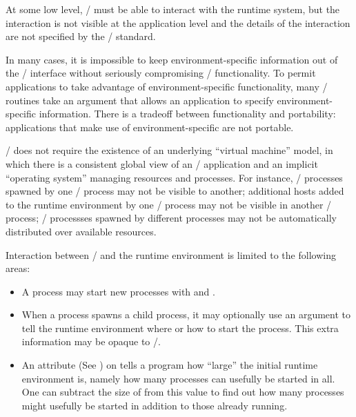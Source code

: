 At some low level, \MPI/ must be able to interact with the
runtime system, but the interaction is not visible at the application
level and the details of the interaction are not specified by the \MPI/
standard.

In many cases, it is impossible to keep environment-specific
information out of the \MPI/ interface without seriously compromising
\MPI/ functionality. To permit applications to take advantage of
environment-specific functionality, many \MPI/ routines take
an  argument that allows an application to
specify environment-specific information. There is a tradeoff
between functionality and portability: applications that
make use of environment-specific  are
not portable.

\MPI/ does not require the existence of an underlying ``virtual machine''
model, in which there is a consistent global view of an \MPI/
application and an implicit ``operating system'' managing resources
and processes. For instance, \MPI/ processes spawned by one \MPI/ process  may not be
visible to another; additional hosts added to the runtime environment
by one \MPI/ process may not be visible in another \MPI/ process; \MPI/ processses spawned by
different processes may not be automatically distributed over available
resources.

Interaction between \MPI/ and the runtime environment is limited to the
following areas:

\begin{itemize}
\item A process may start new processes with  and
.

\item When a process spawns a child process, it may optionally use an
 argument to tell the runtime environment where or how to
start the process. This extra information may be opaque to \MPI/.

\item An attribute 
(See )
 on 
  tells a program how ``large'' the initial runtime environment
  is, namely how many processes can
  usefully be started in all.  One can subtract the size of
   from this value to find out how many processes
  might usefully be started in addition to those already running.

\end{itemize}




